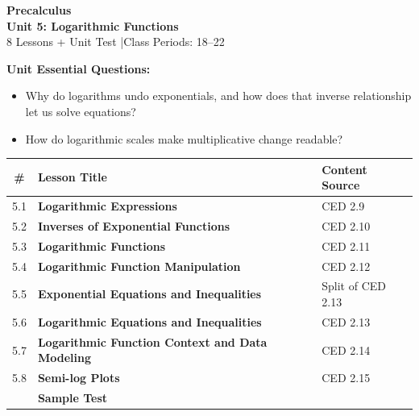 \documentclass[10pt]{article}
\begin{document}
\thispagestyle{empty}

\vspace{-1.05in}

\begin{center}
  {\color{white}\textbf{\LARGE Precalculus}}\\[6pt]
  {\color{skymid}\Large\textbf{Unit 5: Logarithmic Functions}}\\[4pt]
  {\color{white}\small 8 Lessons + Unit Test \quad|\quad Class Periods: 18--22}
\end{center}

\vspace{0.26in}

\begin{tcolorbox}[colback=goldbg, colframe=goldacc, boxrule=0.8pt, arc=2mm,
    left=3mm, right=3mm, top=2mm, bottom=2mm]
\small\textbf{Unit Essential Questions:}
\begin{itemize}[leftmargin=1.4em, itemsep=2pt, topsep=2pt]
  \item Why do logarithms undo exponentials, and how does that inverse relationship let us solve equations?
  \item How do logarithmic scales make multiplicative change readable?
\end{itemize}
\end{tcolorbox}

\vspace{0.14in}

\begin{tocbox}
\small
\renewcommand{\arraystretch}{1.45}
\begin{tabularx}{\linewidth}{@{} c >{\bfseries}X l @{}}
\rowcolor{sky}
\textbf{\#} & \textbf{Lesson Title} & \textbf{Content Source} \\
\midrule
5.1 & Logarithmic Expressions & CED 2.9 \\
5.2 & Inverses of Exponential Functions & CED 2.10 \\
5.3 & Logarithmic Functions & CED 2.11 \\
5.4 & Logarithmic Function Manipulation & CED 2.12 \\
5.5 & Exponential Equations and Inequalities & Split of CED 2.13 \\
5.6 & Logarithmic Equations and Inequalities & CED 2.13 \\
5.7 & Logarithmic Function Context and Data Modeling & CED 2.14 \\
5.8 & Semi-log Plots & CED 2.15 \\
\midrule
\rowcolor{sky}
     & \textbf{Sample Test} &      \\
\end{tabularx}
\end{tocbox}
\end{document}
